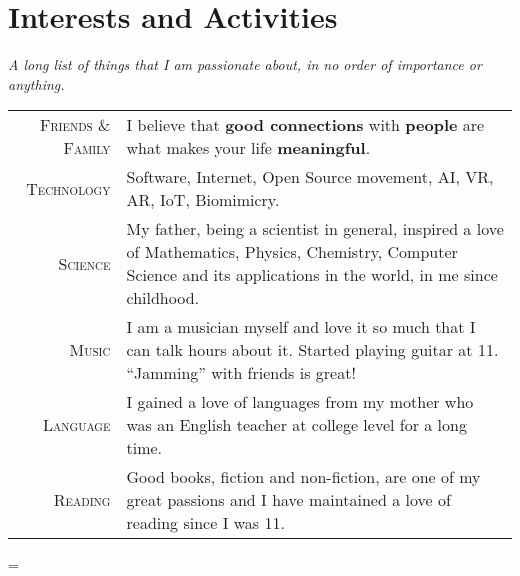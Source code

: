 \documentclass[a4paper,10pt,notitlepage]{article}
\newenvironment{absolutelynopagebreak}
  {\par\nobreak\vfil\penalty0\vfilneg
   \vtop\bgroup}
  {\par\xdef\tpd{\the\prevdepth}\egroup
   \prevdepth=\tpd}
\begin{document}
\begin{absolutelynopagebreak}
\begin{tabular}{r|p{11cm}}
	\end{tabular}
	
	\section{Interests and Activities}
	
	\textit{A long list of things that I am passionate about, in no order of importance or anything.} \\
	
	\begin{tabular}{r|p{11cm}}
		
		\textsc{Friends \& Family}    & I believe that \textbf{good connections} with \textbf{people} are what makes your life \textbf{meaningful}. \\                                                                                                                                                                                                                                                                                    
		\textsc{Technology}           & Software, Internet, Open Source movement, AI, VR, AR, IoT, Biomimicry. \\                                                                                                                                                                                                                                                                                                                         
		\textsc{Science}              & My father, being a scientist in general, inspired a love of Mathematics, Physics, Chemistry, Computer Science and                                   its applications in the world, in me since childhood. \\                                                                                                                                                                                                                        
		\textsc{Music}                & I am a musician myself and love it so much that I can talk hours about it. Started playing guitar at 11. ``Jamming''                                 with friends is great! \\
		\textsc{Language}             & I gained a love of languages from my mother who was an English teacher at college level for a long time. \\
		\textsc{Reading}              & Good books, fiction and non-fiction, are one of my great passions and I have maintained a love of reading since I was 11.                                   \\
		 

\end{tabular}
\end{absolutelynopagebreak}
\end{document}

